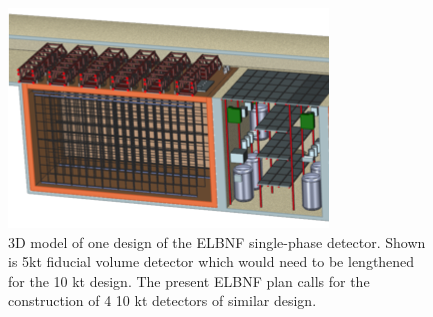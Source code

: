 \begin{figure}[!htb]
\centering
\begin{minipage}[b]{1.0\textwidth}
\begin{center}
\includegraphics[width=.75\textwidth]{./figures/fardet-3D.png}
\end{center}
\end{minipage}
\caption{\small 3D model of one design of the ELBNF single-phase detector. Shown is 5kt fiducial volume detector which would need to be lengthened for the 10 kt design. The present ELBNF plan calls for the construction of 4 10 kt detectors of similar design. }
\label{fig:fardet-overview} 
\end{figure}

